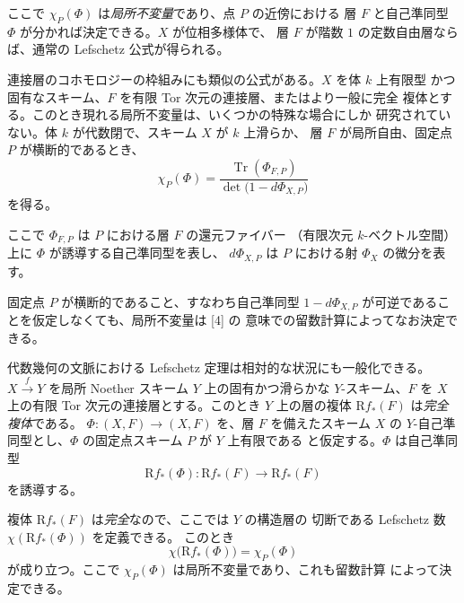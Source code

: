 \clearpage
{}
ここで $\chi_P(\Phi)$ は\emph{局所不変量}であり、点 $P$ の近傍における
層 $F$ と自己準同型 $\Phi$ が分かれば決定できる。$X$ が位相多様体で、
層 $F$ が階数 $1$ の定数自由層ならば、通常の Lefschetz 公式が得られる。

連接層のコホモロジーの枠組みにも類似の公式がある。$X$ を体 $k$ 上有限型
かつ固有なスキーム、$F$ を有限 Tor 次元の連接層、またはより一般に完全
複体とする。このとき現れる局所不変量は、いくつかの特殊な場合にしか
研究されていない。体 $k$ が代数閉で、スキーム $X$ が $k$ 上滑らか、
層 $F$ が局所自由、固定点 $P$ が横断的であるとき、
\[
\chi_P(\Phi)
=\frac{\operatorname{Tr}(\Phi_{F,P})}
       {\det\bigl(1-d\Phi_{X,P}\bigr)}
\]
を得る。

ここで $\Phi_{F,P}$ は $P$ における層 $F$ の還元ファイバー
（有限次元 $k$-ベクトル空間）上に $\Phi$ が誘導する自己準同型を表し、
$d\Phi_{X,P}$ は $P$ における射 $\Phi_X$ の微分を表す。

固定点 $P$ が横断的であること、すなわち自己準同型
$1-d\Phi_{X,P}$ が可逆であることを仮定しなくても、局所不変量は [4] の
意味での留数計算によってなお決定できる。

代数幾何の文脈における Lefschetz 定理は相対的な状況にも一般化できる。
$X\xrightarrow{f}Y$ を局所 Noether スキーム $Y$ 上の固有かつ滑らかな
$Y$-スキーム、$F$ を $X$ 上の有限 Tor 次元の連接層とする。このとき
$Y$ 上の層の複体 $\mathrm{R}f_*(F)$ は\emph{完全複体}である。
$\Phi\colon(X,F)\longrightarrow(X,F)$ を、層 $F$ を備えたスキーム $X$
の $Y$-自己準同型とし、$\Phi$ の固定点スキーム $P$ が $Y$ 上有限である
と仮定する。$\Phi$ は自己準同型
\[
\mathrm{R}f_*(\Phi)\colon
\mathrm{R}f_*(F)\longrightarrow\mathrm{R}f_*(F)
\]
を誘導する。

複体 $\mathrm{R}f_*(F)$ は\emph{完全}なので、ここでは $Y$ の構造層の
切断である Lefschetz 数 $\chi(\mathrm{R}f_*(\Phi))$ を定義できる。
このとき
\[
\chi\bigl(\mathrm{R}f_*(\Phi)\bigr)=\chi_P(\Phi)
\]
が成り立つ。ここで $\chi_P(\Phi)$ は局所不変量であり、これも留数計算
によって決定できる。
